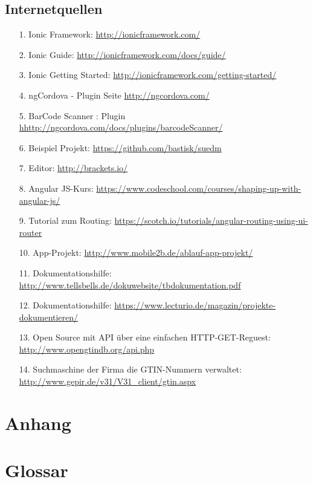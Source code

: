 \documentclass[12pt,a4paper]{article}
\begin{document}
\subsection*{Internetquellen}
\begin{itemize}
\item[1.]Ionic Framework: \url{http://ionicframework.com/}
\item[2.]Ionic Guide: \url{http://ionicframework.com/docs/guide/}
\item[3.]Ionic Getting Started: \url{http://ionicframework.com/getting-started/}
\item[4.]ngCordova - Plugin Seite \url{http://ngcordova.com/}
\item[5.]BarCode Scanner : Plugin \url{hhttp://ngcordova.com/docs/plugins/barcodeScanner/}
\item[6.]Beispiel Projekt: \url{https://github.com/bastisk/suedm}
\item[7.]Editor: \url{http://brackets.io/}
\item[8.]Angular JS-Kurs: \url{https://www.codeschool.com/courses/shaping-up-with-angular-js/}
\item[9.]Tutorial zum Routing: \url{https://scotch.io/tutorials/angular-routing-using-ui-router}
\item[10.]App-Projekt: \url{http://www.mobile2b.de/ablauf-app-projekt/}
\item[11.] Dokumentationshilfe: \url{http://www.tellsbells.de/dokuwebsite/tbdokumentation.pdf}
\item[12.] Dokumentationshilfe: \url{https://www.lecturio.de/magazin/projekte-dokumentieren/}
\item[13.] Open Source mit API über eine einfachen HTTP-GET-Reguest: \url{http://www.opengtindb.org/api.php}
\item[14.] Suchmaschine der Firma die GTIN-Nummern verwaltet: \url{http://www.gepir.de/v31/V31_client/gtin.aspx}
\end{itemize}
\newpage
\section*{Anhang}
\newpage
\section*{Glossar}
\end{document}
